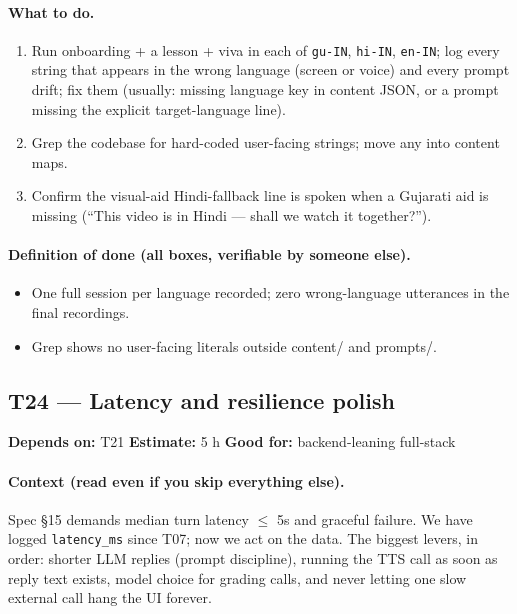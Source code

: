 \documentclass[11pt]{article}
\newcommand{\code}[1]{\texttt{#1}}
\newcommand{\taskmeta}[3]{\noindent\textbf{Depends on:} #1 \quad\textbullet\quad \textbf{Estimate:} #2 \quad\textbullet\quad \textbf{Good for:} #3\par\vspace{2pt}}
\newcommand{\ctx}[1]{\paragraph{Context (read even if you skip everything else).} #1}
\newcommand{\dod}{\paragraph{Definition of done (all boxes, verifiable by someone else).}}
\begin{document}
\paragraph{What to do.}
\begin{enumerate}
  \item Run onboarding + a lesson + viva in each of \code{gu-IN}, \code{hi-IN}, \code{en-IN}; log every string that appears in the wrong language (screen or voice) and every prompt drift; fix them (usually: missing language key in content JSON, or a prompt missing the explicit target-language line).
  \item Grep the codebase for hard-coded user-facing strings; move any into content maps.
  \item Confirm the visual-aid Hindi-fallback line is spoken when a Gujarati aid is missing (``This video is in Hindi --- shall we watch it together?'').
\end{enumerate}
\dod
\begin{itemize}
  \item One full session per language recorded; zero wrong-language utterances in the final recordings.
  \item Grep shows no user-facing literals outside content/ and prompts/.
\end{itemize}

\subsection{T24 --- Latency and resilience polish}
\taskmeta{T21}{5 h}{backend-leaning full-stack}
\ctx{Spec \S15 demands median turn latency $\leq$ 5s and graceful failure. We have logged \code{latency\_ms} since T07; now we act on the data. The biggest levers, in order: shorter LLM replies (prompt discipline), running the TTS call as soon as reply text exists, model choice for grading calls, and never letting one slow external call hang the UI forever.}
\end{document}
